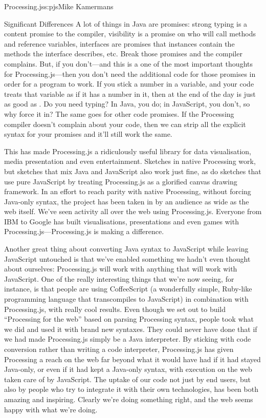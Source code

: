 \begin{aosachapter}{Processing.js}{s:pjs}{Mike Kamermans}
\begin{aosasect1}{Significant Differences}
A lot of things in Java are promises: strong typing is a content
promise to the compiler, visibility is a promise on who will call
methods and reference variables, interfaces are promises that
instances contain the methods the interface describes, etc. Break
those promises and the compiler complains. But, if you don't---and
this is a one of the most important thoughts for Processing.js---then
you don't need the additional code for those promises in order for a
program to work. If you stick a number in a variable, and your code
treats that variable as if it has a number in it, then at the end of
the day  is just as good as . Do you need
typing? In Java, you do; in JavaScript, you don't, so why force it in?
The same goes for other code promises. If the Processing compiler
doesn't complain about your code, then we can strip all the explicit
syntax for your promises and it'll still work the same.

This has made Processing.js a ridiculously useful library for data
visualisation, media presentation and even entertainment. Sketches in
native Processing work, but sketches that mix Java and JavaScript also
work just fine, as do sketches that use pure JavaScript by treating
Processing.js as a glorified canvas drawing framework. In an effort to
reach parity with native Processing, without forcing Java-only syntax,
the project has been taken in by an audience as wide as the web
itself. We've seen activity all over the web using
Processing.js. Everyone from IBM to Google has built visualisations,
presentations and even games with Processing.js---Processing.js is
making a difference.

Another great thing about converting Java syntax to JavaScript while
leaving JavaScript untouched is that we've enabled something we
hadn't even thought about ourselves: Processing.js will work with
anything that will work with JavaScript. One of the really interesting
things that we're now seeing, for instance, is that people are using
CoffeeScript (a wonderfully simple, Ruby-like programming language
that transcompiles to JavaScript) in combination with Processing.js,
with really cool results. Even though we set out to build ``Processing
for the web'' based on parsing Processing syntax, people took what we
did and used it with brand new syntaxes. They could never have done
that if we had made Processing.js simply be a Java interpreter. By
sticking with code conversion rather than writing a code interpreter,
Processing.js has given Processing a reach on the web far beyond what
it would have had if it had stayed Java-only, or even if it had kept a
Java-only syntax, with execution on the web taken care of by
JavaScript. The uptake of our code not just by end users, but also by
people who try to integrate it with their own technologies, has been
both amazing and inspiring. Clearly we're doing something right, and
the web seems happy with what we're doing.


\end{aosasect1}
\end{aosachapter}

